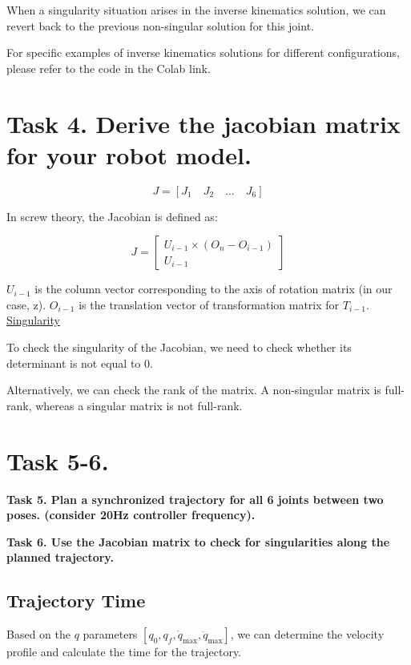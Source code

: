 \documentclass{article}
\begin{document}
When a singularity situation arises in the inverse kinematics solution, 
we can revert back to the previous non-singular solution for this joint.

For specific examples of inverse kinematics solutions for different configurations, please refer to the code in the Colab link. 

\section{Task 4. Derive the jacobian matrix for your robot model.}

\[ J = [J_1 \quad J_2 \quad \ldots \quad J_6] \]

In screw theory, the Jacobian is defined as:

\[ J = \begin{bmatrix}
    U_{i-1} \times (O_n - O_{i-1}) \\
    U_{i-1}
\end{bmatrix} \]

    
$U_{i-1}$ is the column vector corresponding to the axis of rotation matrix (in our case, z). 
$O_{i-1}$ is the translation vector of transformation matrix for $T_{i-1}$. \\

\underline{Singularity}

To check the singularity of the Jacobian, we need to check whether its determinant is not 
equal to 0. 

Alternatively, we can check the rank of the matrix. A non-singular matrix is full-rank, whereas a singular matrix is not full-rank.

\section{Task 5-6.}
\textbf{Task 5. Plan a synchronized trajectory for all 6 joints between two poses. (consider 20Hz
controller frequency).\\}

\textbf{Task 6. Use the Jacobian matrix to check for singularities along the planned trajectory.}

\subsection{Trajectory Time}
Based on the $q$ parameters $[q_0, q_f, \dot{q}_{\text{max}}, \ddot{q}_{\text{max}}]$, we can determine the velocity profile and calculate the time for the trajectory.
\end{document}
